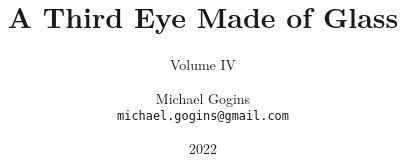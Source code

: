 

\title{A Third Eye Made of Glass}
\subtitle{Volume IV}
\author{Michael Gogins \\ \texttt{michael.gogins@gmail.com}}
\date{2022 }
\publishers{Irreducible Productions, New York}

\maketitle
	




